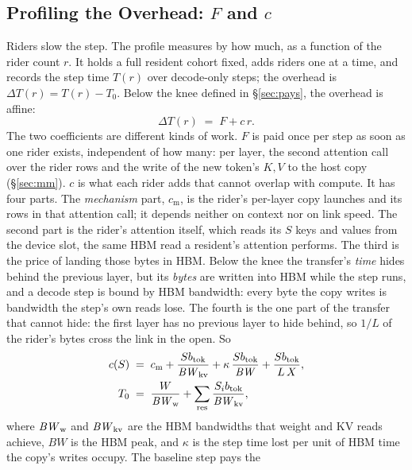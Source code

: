 \subsection{Profiling the Overhead: $F$ and $c$}\label{sec:profile}

Riders slow the step. The profile measures by how much, as a function of the
rider count $r$. It holds a full resident cohort fixed, adds riders one at a
time, and records the step time $T(r)$ over decode-only steps; the overhead is
$\Delta T(r) = T(r) - T_0$. Below the knee defined in \S\ref{sec:pays}, the
overhead is affine:
\begin{equation}
  \Delta T(r) \;=\; F + c\,r .
  \label{eq:law}
\end{equation}
The two coefficients are different kinds of work. $F$ is paid once per step as
soon as one rider exists, independent of how many: per layer, the second
attention call over the rider rows and the write of the new token's $K,V$ to the
host copy (\S\ref{sec:mm}). $c$ is what each rider adds that cannot overlap
with compute. It has four parts. The \emph{mechanism} part, $c_{\mathrm{m}}$, is
the rider's per-layer copy launches and its rows in that attention call; it
depends neither on context nor on link speed. The second part is the rider's
attention itself, which reads its $S$ keys and values from the device slot, the
same HBM read a resident's attention performs. The third is the price of
landing those bytes in HBM. Below the knee the transfer's \emph{time} hides
behind the previous layer, but its \emph{bytes} are written into HBM while the
step runs, and a decode step is bound by HBM bandwidth: every byte the copy
writes is bandwidth the step's own reads lose. The fourth is the one part of
the transfer that cannot hide: the first layer has no previous layer to hide
behind, so $1/L$ of the rider's bytes cross the link in the open. So
\begin{equation}
\begin{aligned}
  c(S) &\;=\; c_{\mathrm{m}} + \frac{Sb_{\mathrm{tok}}}{\mathit{BW}_{\mathrm{kv}}} + \kappa\,\frac{Sb_{\mathrm{tok}}}{\mathit{BW}}
           + \frac{Sb_{\mathrm{tok}}}{L\,X},\\
  T_0 &\;=\; \frac{W}{\mathit{BW}_{\mathrm{w}}} + \sum_{\mathrm{res}} \frac{S_ib_{\mathrm{tok}}}{\mathit{BW}_{\mathrm{kv}}},
\end{aligned}
  \label{eq:cS}
\end{equation}
where $\mathit{BW}_{\mathrm{w}}$ and $\mathit{BW}_{\mathrm{kv}}$ are the HBM bandwidths that weight and KV reads
achieve, $\mathit{BW}$ is the HBM peak, and $\kappa$ is the step time lost per
unit of HBM time the copy's writes occupy. The baseline step pays the
